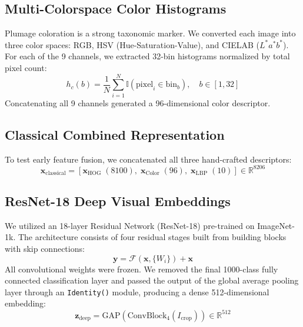 \documentclass[conference]{IEEEtran}
\begin{document}
\subsection{Multi-Colorspace Color Histograms}
Plumage coloration is a strong taxonomic marker. We converted each image into three color spaces: RGB, HSV (Hue-Saturation-Value), and CIELAB ($L^*a^*b^*$). For each of the 9 channels, we extracted 32-bin histograms normalized by total pixel count:
\begin{equation}
h_c(b) = \frac{1}{N} \sum_{i=1}^{N} \mathbb{I}(\text{pixel}_i \in \text{bin}_b), \quad b \in [1, 32]
\end{equation}
Concatenating all 9 channels generated a 96-dimensional color descriptor.

\subsection{Classical Combined Representation}
To test early feature fusion, we concatenated all three hand-crafted descriptors:
\begin{equation}
\mathbf{x}_{\text{classical}} = [\mathbf{x}_{\text{HOG}} \; (8100), \; \mathbf{x}_{\text{Color}} \; (96), \; \mathbf{x}_{\text{LBP}} \; (10)] \in \mathbb{R}^{8206}
\end{equation}

\subsection{ResNet-18 Deep Visual Embeddings}
We utilized an 18-layer Residual Network (ResNet-18) pre-trained on ImageNet-1k. The architecture consists of four residual stages built from building blocks with skip connections:
\begin{equation}
\mathbf{y} = \mathcal{F}(\mathbf{x}, \{W_i\}) + \mathbf{x}
\end{equation}
All convolutional weights were frozen. We removed the final 1000-class fully connected classification layer and passed the output of the global average pooling layer through an \texttt{Identity()} module, producing a dense 512-dimensional embedding:
\begin{equation}
\mathbf{z}_{\text{deep}} = \text{GAP}(\text{ConvBlock}_4(I_{\text{crop}})) \in \mathbb{R}^{512}
\end{equation}

\end{document}
